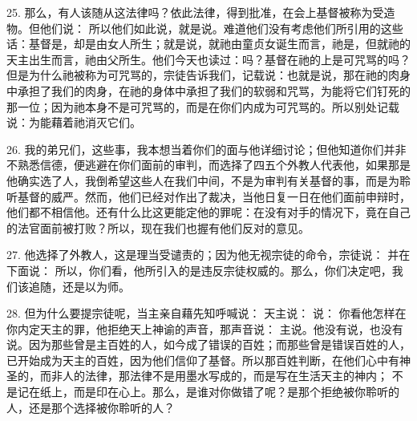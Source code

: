 \newline{}25. 那么，有人该随从这法律吗？依此法律，得到批准，在会上基督被称为受造物。但他们说： 所以他们如此说，就是说。难道他们没有考虑他们所引用的这些话：基督是，却是由女人所生；就是说，就祂由童贞女诞生而言，祂是，但就祂的天主出生而言，祂由父所生。他们今天也读过：吗？基督在祂的上是可咒骂的吗？但是为什么祂被称为可咒骂的，宗徒告诉我们，记载说：也就是说，那在祂的肉身中承担了我们的肉身，在祂的身体中承担了我们的软弱和咒骂，为能将它们钉死的那一位；因为祂本身不是可咒骂的，而是在你们内成为可咒骂的。所以别处记载说：为能藉着祂消灭它们。\newline{}\par

\newline{}26. 我的弟兄们，这些事，我本想当着你们的面与他详细讨论；但他知道你们并非不熟悉信德，便逃避在你们面前的审判，而选择了四五个外教人代表他，如果那是他确实选了人，我倒希望这些人在我们中间，不是为审判有关基督的事，而是为聆听基督的威严。然而，他们已经对作出了裁决，当他日复一日在他们面前申辩时，他们都不相信他。还有什么比这更能定他的罪呢：在没有对手的情况下，竟在自己的法官面前被打败？所以，现在我们也握有他们反对的意见。\newline{}\par

\newline{}27. 他选择了外教人，这是理当受谴责的；因为他无视宗徒的命令，宗徒说： 并在下面说： 所以，你们看，他所引入的是违反宗徒权威的。那么，你们决定吧，我们该追随，还是以为师。\newline{}\par

28. 但为什么要提宗徒呢，当主亲自藉先知呼喊说：  天主说： 说： 你看他怎样在你内定天主的罪，他拒绝天上神谕的声音，那声音说： 主说。他没有说，也没有说。因为那些曾是主百姓的人，如今成了错误的百姓；而那些曾是错误百姓的人，已开始成为天主的百姓，因为他们信仰了基督。所以那百姓判断，在他们心中有神圣的，而非人的法律，那法律不是用墨水写成的，而是写在生活天主的神内； 不是记在纸上，而是印在心上。那么，是谁对你做错了呢？是那个拒绝被你聆听的人，还是那个选择被你聆听的人？\par

